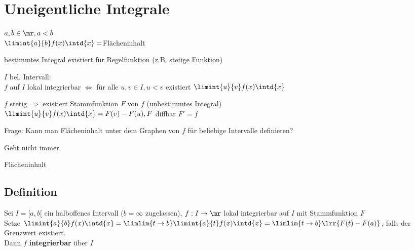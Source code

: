 \newpage
\section{Uneigentliche Integrale}
$a,b\in\mr, a<b$\\
$\limint{a}{b}f(x)\intd{x}=$Flächeninhalt


bestimmtes Integral existiert für Regelfunktion (z.B. stetige Funktion)

$I$ bel. Intervall:\\
$f$ auf $I$ lokal integrierbar $\Leftrightarrow$ für alle $u,v\in I, u<v$ existiert $\limint{u}{v}f(x)\intd{x}$

$f$ stetig $\Rightarrow$ existiert Stammfunktion $F$ von $f$ (unbestimmtes Integral)\\
$\limint{u}{v}f(x)\intd{x}=F(v)-F(u), F$ diffbar $F'=f$

Frage: Kann man Flächeninhalt unter dem Graphen von $f$ für beliebige Intervalle definieren?

Geht nicht immer


 Flächeninhalt

\subsection{Definition}
		\item Sei $I=[a,b[$ ein halboffenes Intervall ($b=\infty$ zugelassen), $f:I\rightarrow\mr$ lokal integrierbar auf $I$ mit Stammfunktion $F$\\
			Setze $\limint{a}{b}f(x)\intd{x}=\limlim{t\rightarrow b}\limint{a}{t}f(x)\intd{x}=\limlim{t\rightarrow b}\lrr{F(t)-F(a)}$, falls der Grenzwert existiert.\\
			Dann $f$ \textbf{integrierbar} über $I$
			
